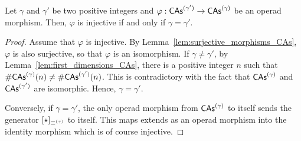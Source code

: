 \begin{Lemma} \label{lem:injective_morphisms_CAs}
    Let $\gamma$ and $\gamma'$ be two positive integers and
    $\varphi:\mathsf{CAs}^{(\gamma')} \to \mathsf{CAs}^{(\gamma)}$ be an operad morphism.
    Then, $\varphi$ is injective if and only if $\gamma = \gamma'$.
\end{Lemma}
\begin{proof}
    Assume that $\varphi$ is injective. By
    Lemma~\ref{lem:surjective_morphisms_CAs}, $\varphi$ is also
    surjective, so that $\varphi$ is an isomorphism. If
    $\gamma \ne \gamma'$, by Lemma~\ref{lem:first_dimensions_CAs}, there
    is a positive integer $n$ such that
    $\# \mathsf{CAs}^{(\gamma)}(n) \ne \# \mathsf{CAs}^{(\gamma')}(n)$. This is contradictory
    with the fact that $\mathsf{CAs}^{(\gamma)}$ and $\mathsf{CAs}^{(\gamma')}$ are
    isomorphic. Hence, $\gamma = \gamma'$.
    \smallbreak

    Conversely, if $\gamma = \gamma'$, the only operad morphism from
    $\mathsf{CAs}^{(\gamma)}$ to itself sends the generator
    $[\operatorname{\star}]_{\operatorname{\equiv}^{(\gamma)}}$ to itself. This maps extends as
    an operad morphism into the identity morphism which is of course
    injective.
\end{proof}
\medbreak

